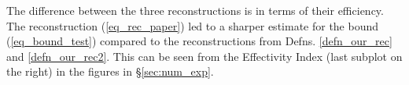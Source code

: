 \documentclass[12pt,a4paper]{article}
\numberwithin{equation}{section}
\theoremstyle{definition}
\begin{document}
The difference between the three reconstructions is in terms of their efficiency.  The reconstruction (\ref{eq_rec_paper}) led to a sharper estimate for the bound (\ref{eq_bound_test}) compared to the reconstructions from Defns. \ref{defn_our_rec} and \ref{defn_our_rec2}.  This can be seen from the Effectivity Index (last subplot on the right) in the figures in \S\ref{sec:num_exp}.




\end{document}
